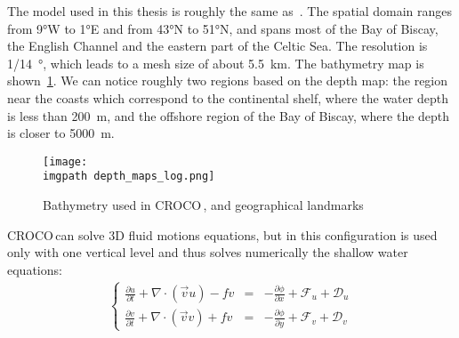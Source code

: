 \documentclass[../../Main_ManuscritThese.tex]{subfiles}
\newcommand{\CROCO}{CROCO\,}
\newcommand\imgpath{/home/victor/acadwriting/Manuscrit/Text/Chapter5/img/}
\begin{document}
The model used in this thesis is roughly the same as~\cite{boutet_estimation_2015}. The spatial domain ranges from \ang{9}W to \ang{1}E and from \ang{43}N to \ang{51}N, and spans most of the Bay of Biscay, the English Channel and the eastern part of the Celtic Sea.
The resolution is \SI{1/14}{\degree}, which leads to a mesh size of about \SI{5.5}{\kilo\metre}. The bathymetry map is shown~\cref{fig:depth_maps}. We can notice roughly two regions based on the depth map: the region near the coasts which correspond to the continental shelf, where the water depth is less than \SI{200}{\meter}, and the offshore region of the Bay of Biscay, where the depth is closer to \SI{5000}{\meter}.
\begin{figure}[ht]
  \centering
  \texttt{[image: \\imgpath depth\_maps\_log.png]}
  \caption{\label{fig:depth_maps} Bathymetry used in \CROCO, and geographical landmarks}
\end{figure}
\CROCO can solve 3D fluid motions equations, but in this configuration is used only with one vertical level and thus solves numerically the shallow water equations:
\begin{align}
  \left\{
  \begin{array}{rcl}
    \frac{\partial u}{\partial t} + \nabla \cdot \left(\vec{v}u\right) - fv &=& -\frac{\partial \phi}{\partial x} + \mathcal{F}_{u} + \mathcal{D}_u \\
       \frac{\partial v}{\partial t} + \nabla \cdot \left(\vec{v}v\right) + fv &=& -\frac{\partial \phi}{\partial y} + \mathcal{F}_{v} + \mathcal{D}_v
  \end{array}
       \right.
\end{align}
\end{document}
